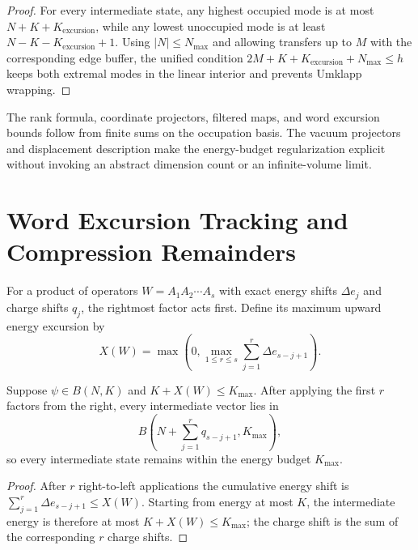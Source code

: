 \begin{proof}
For every intermediate state, any highest occupied mode is at most $N+K+K_{\mathrm{excursion}}$, while any lowest unoccupied mode is at least $N-K-K_{\mathrm{excursion}}+1$. Using $|N|\le N_{\max}$ and allowing transfers up to $M$ with the corresponding edge buffer, the unified condition $2M+K+K_{\mathrm{excursion}}+N_{\max}\le h$ keeps both extremal modes in the linear interior and prevents Umklapp wrapping.
\end{proof}

\begin{remark}
The rank formula, coordinate projectors, filtered maps, and word excursion bounds follow from finite sums on the occupation basis. The vacuum projectors and displacement description make the energy-budget regularization explicit without invoking an abstract dimension count or an infinite-volume limit.
\end{remark}

\section{Word Excursion Tracking and Compression Remainders}

For a product of operators $W=A_1A_2\cdots A_s$ with exact energy shifts $\Delta e_j$ and charge shifts $q_j$, the rightmost factor acts first. Define its maximum upward energy excursion by
\begin{equation}
X(W)=\max\left(0,\max_{1\le r\le s}\sum_{j=1}^{r}\Delta e_{s-j+1}\right).
\end{equation}

\begin{theorem}
\label{thm:word_evaluation_safety}
Suppose $\psi\in B(N,K)$ and $K+X(W)\le K_{\max}$. After applying the first $r$ factors from the right, every intermediate vector lies in
\begin{equation}
B\left(N+\sum_{j=1}^{r}q_{s-j+1},K_{\max}\right),
\end{equation}
so every intermediate state remains within the energy budget $K_{\max}$.
\end{theorem}

\begin{proof}
After $r$ right-to-left applications the cumulative energy shift is $\sum_{j=1}^{r}\Delta e_{s-j+1}\le X(W)$. Starting from energy at most $K$, the intermediate energy is therefore at most $K+X(W)\le K_{\max}$; the charge shift is the sum of the corresponding $r$ charge shifts.
\end{proof}

